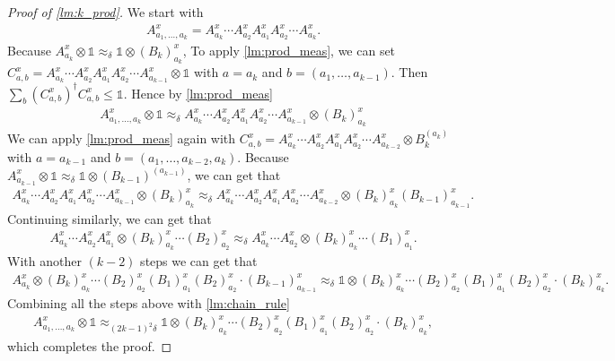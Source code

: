 \documentclass[10pt,a4paper]{article}
\theoremstyle{plain}
\theoremstyle{definition}
\newcommand {\id} {\ensuremath{\mathds{1}}}
\newcommand{\x}{\otimes}
\newcommand{\ct}{^{\dagger}}
\newcommand{\appd}[1]{\approx_{#1}}
\newcommand{\1}{\mathbb{1}} %
\begin{document}
\begin{proof}[Proof of \cref{lm:k_prod}]
	We start with 
	\begin{align*}
		A^x_{a_1, \ldots, a_k} = A^x_{a_k} \cdots A^x_{a_2} A^x_{a_1} A^x_{a_2} \cdots A^x_{a_k}.
	\end{align*}
	Because $A^x_{a_k} \x \id \appd{\delta} \id \x (B_k)^x_{a_k}$, 
	To apply \cref{lm:prod_meas}, 
	we can set $C^x_{a,b} = 
	A^x_{a_k} \cdots A^x_{a_2} A^x_{a_1} A^x_{a_2} \cdots A^x_{a_{k-1}} \x \id$ 
	with $a = a_k$ and $b = (a_1, \ldots, a_{k-1})$.
	Then $\sum_b (C^x_{a,b})\ct C^x_{a,b} \leq \id$.
	Hence by \cref{lm:prod_meas}
	\begin{align*}
		A^x_{a_1, \ldots, a_k} \x \id \appd{\delta} A^x_{a_k} \cdots A^x_{a_2} A^x_{a_1} A^x_{a_2} \cdots A^x_{a_{k-1}} \x (B_k)^x_{a_k}
	\end{align*}
	We can apply \cref{lm:prod_meas} again with $C^x_{a,b} = A^x_{a_k} \cdots A^x_{a_2} A^x_{a_1} A^x_{a_2} \cdots A^x_{a_{k-2}} \x B_k^{(a_k)}$ with $a= a_{k-1}$ and $b = (a_1,\ldots, a_{k-2}, a_k)$.
	Because $A^x_{a_{k-1}} \x \id \appd{\delta} \id \x (B_{k-1})^{(a_{k-1})}$, we can get that
	\begin{align*}
		A^x_{a_k} \cdots A^x_{a_2} A^x_{a_1} A^x_{a_2} \cdots A^x_{a_{k-1}} \x (B_k)^x_{a_k}
		\appd{\delta} A^x_{a_k} \cdots A^x_{a_2} A^x_{a_1} A^x_{a_2} \cdots A^x_{a_{k-2}}  \x (B_k)^x_{a_k}(B_{k-1})^x_{a_{k-1}}.
	\end{align*}
	Continuing similarly, we can get that
	\begin{align*}
	A^x_{a_k} \cdots A^x_{a_2} A^x_{a_1} \x  (B_k)^x_{a_k} \cdots (B_2)^x_{a_2}
	 \appd{\delta} 
	A^x_{a_k} \cdots A^x_{a_2}  \x (B_k)^x_{a_k} \cdots (B_1)^x_{a_1}.
	\end{align*}
	With another $(k-2)$ steps we can get that 
	\begin{align*}
		A^x_{a_k} \x (B_k)^x_{a_k} \cdots (B_2)^x_{a_2} (B_1)^x_{a_1} (B_2)^x_{a_2} \cdot  (B_{k-1})^x_{a_{k-1}}\appd{\delta}
		\id \x (B_k)^x_{a_k} \cdots (B_2)^x_{a_2} (B_1)^x_{a_1} (B_2)^x_{a_2} \cdot  (B_{k})^x_{a_{k}}. 
	\end{align*}
	Combining all the steps above with \cref{lm:chain_rule}
	\begin{align*}
		A^x_{a_1, \ldots, a_k} \x \id  \appd{(2k-1)^2\delta} \id \x
		(B_k)^x_{a_k} \cdots (B_2)^x_{a_2} (B_1)^x_{a_1} (B_2)^x_{a_2} \cdot  (B_{k})^x_{a_{k}},
	\end{align*}
	which completes the proof.
\end{proof}
\end{document}

